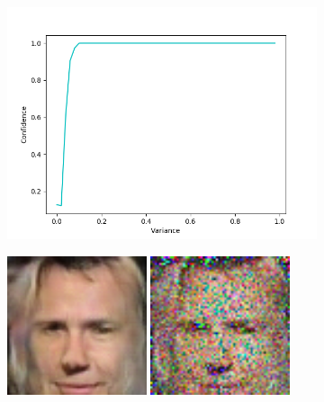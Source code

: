 \begin{figure}[h]
	\begin{subfigure}[b]{0.5\textwidth}
		\includegraphics[width=\textwidth]{figures/diversity_gan2_fake_dis_gen_images_plot}
	\end{subfigure}
	\begin{subfigure}[b]{0.5\textwidth}
		\centering
		\includegraphics[width=0.45\textwidth]{figures/diversity_gan2_fake_dis_gen_images_var_0}
		\includegraphics[width=0.45\textwidth]{figures/diversity_gan2_fake_dis_gen_images_var_30}

\end{subfigure}
\end{figure}
